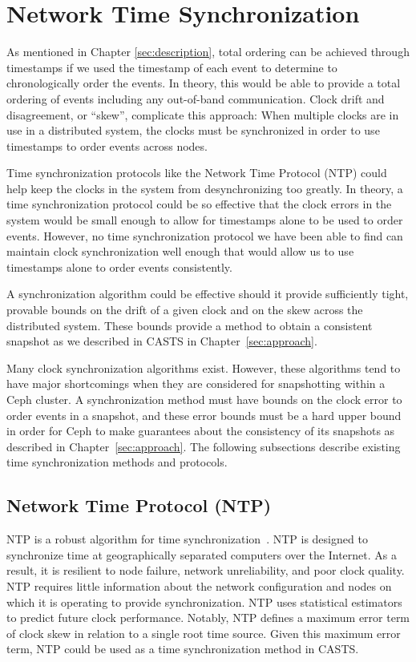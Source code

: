 \section{Network Time Synchronization}

As mentioned in Chapter \ref{sec:description}, total ordering can be
achieved through timestamps if we used the timestamp of each event to 
determine to chronologically order the events. 
In theory, this would be able to provide
a total ordering of events including any out-of-band
communication. Clock drift and disagreement, or ``skew'', complicate this approach: When
multiple clocks are in use in a distributed system, the clocks must be
synchronized in order to use timestamps to order events across nodes.

Time synchronization protocols like the Network Time Protocol (NTP)
could help keep the clocks in the system from desynchronizing too
greatly. In theory, a time synchronization protocol could be so effective that 
the clock errors in the system would be small enough to allow for timestamps 
alone to be used to order events. However, no time synchronization protocol 
we have been able to
find can maintain clock synchronization well enough that would allow
us to use timestamps alone to order events consistently. 

A synchronization algorithm could be effective should it provide
sufficiently tight, provable bounds on the drift of a given clock and
on the skew across the distributed system. These bounds provide a
method to obtain a consistent snapshot as we described in CASTS
in Chapter~\ref{sec:approach}.

Many clock synchronization algorithms exist. However, these
algorithms tend to have major shortcomings when they are considered
for snapshotting within a Ceph cluster. A
synchronization method must have bounds on the clock error to order
events in a snapshot, and these error bounds must be a hard upper
bound in order for Ceph to make guarantees about the consistency of
its snapshots as described in Chapter~\ref{sec:approach}. The following subsections describe existing time
synchronization methods and protocols.

\subsection{Network Time Protocol (NTP)}

NTP is a robust algorithm for time
synchronization~\citep{Burbank2010}. NTP is designed to synchronize
time at geographically separated computers over the Internet. As a
result, it is resilient to node failure, network unreliability, and
poor clock quality. NTP requires little information about the
network configuration and nodes on which it is operating to provide 
synchronization. NTP uses statistical estimators to predict
future clock performance. Notably, NTP defines a maximum error
term of clock skew in relation to a single root time source. Given this maximum
error term, NTP could be used as a time synchronization method
in CASTS.

